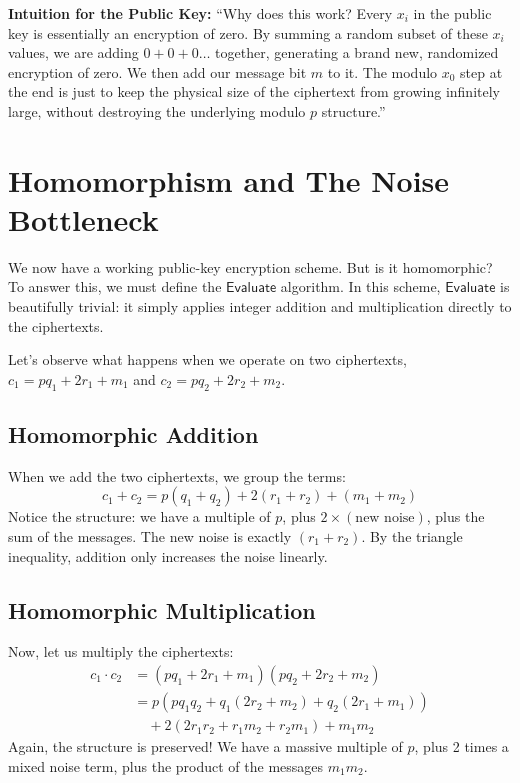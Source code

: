 \documentclass[11pt]{article}
\begin{document}
\begin{speakernote}
\textbf{Intuition for the Public Key:}
``Why does this work? Every $x_i$ in the public key is essentially an encryption of zero. By summing a random subset of these $x_i$ values, we are adding $0 + 0 + 0 \dots$ together, generating a brand new, randomized encryption of zero. We then add our message bit $m$ to it. The modulo $x_0$ step at the end is just to keep the physical size of the ciphertext from growing infinitely large, without destroying the underlying modulo $p$ structure.''
\end{speakernote}

\section{Homomorphism and The Noise Bottleneck}

We now have a working public-key encryption scheme. But is it homomorphic? To answer this, we must define the $\mathsf{Evaluate}$ algorithm. In this scheme, $\mathsf{Evaluate}$ is beautifully trivial: it simply applies integer addition and multiplication directly to the ciphertexts.

Let's observe what happens when we operate on two ciphertexts, $c_1 = p q_1 + 2r_1 + m_1$ and $c_2 = p q_2 + 2r_2 + m_2$.

\subsection{Homomorphic Addition}
When we add the two ciphertexts, we group the terms:
\begin{equation}
    c_1 + c_2 = p(q_1 + q_2) + 2(r_1 + r_2) + (m_1 + m_2)
\end{equation}
Notice the structure: we have a multiple of $p$, plus $2 \times (\text{new noise})$, plus the sum of the messages. The new noise is exactly $(r_1 + r_2)$. By the triangle inequality, addition only increases the noise linearly.

\subsection{Homomorphic Multiplication}
Now, let us multiply the ciphertexts:
\begin{align}
    c_1 \cdot c_2 &= (p q_1 + 2r_1 + m_1)(p q_2 + 2r_2 + m_2) \\
    &= p(p q_1 q_2 + q_1(2r_2 + m_2) + q_2(2r_1 + m_1)) \nonumber \\
    &\quad + 2(2r_1 r_2 + r_1 m_2 + r_2 m_1) + m_1 m_2
\end{align}
Again, the structure is preserved! We have a massive multiple of $p$, plus 2 times a mixed noise term, plus the product of the messages $m_1 m_2$. 
\end{document}

